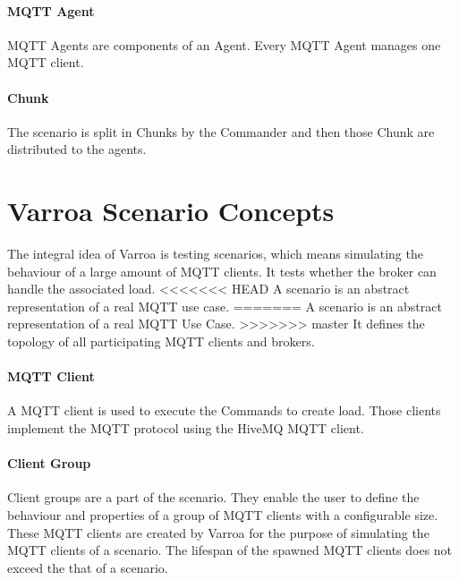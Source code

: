 \paragraph{MQTT Agent}
MQTT Agents are components of an Agent.
Every MQTT Agent manages one MQTT client.

\paragraph{Chunk}
The scenario is split in Chunks by the Commander and then those Chunk are distributed to the agents.


\section{Varroa Scenario Concepts}
The integral idea of Varroa is testing scenarios, which means simulating the behaviour of a large amount of MQTT clients.
It tests whether the broker can handle the associated load.
<<<<<<< HEAD
A scenario is an abstract representation of a real MQTT use case.
=======
A scenario is an abstract representation of a real MQTT Use Case.
>>>>>>> master
It defines the topology of all participating MQTT clients and brokers.

\paragraph{MQTT Client}
A MQTT client is used to execute the Commands to create load.
Those clients implement the MQTT protocol using the HiveMQ MQTT client.

\paragraph{Client Group}
Client groups are a part of the scenario.
They enable the user to define the behaviour and properties of a group of MQTT clients with a configurable size.
These MQTT clients are created by Varroa for the purpose of simulating the MQTT clients of a scenario.
The lifespan of the spawned MQTT clients does not exceed the that of a scenario.

